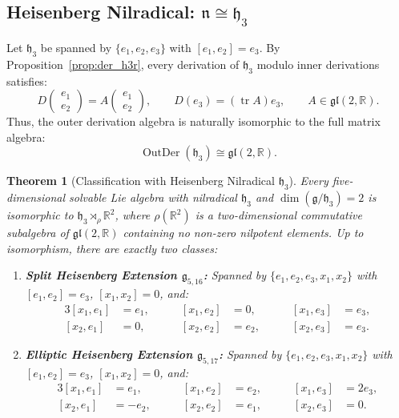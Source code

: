 \documentclass[11pt,a4paper]{article}
\newtheorem{theorem}{Theorem}[section]
\theoremstyle{definition}
\theoremstyle{remark}
\newcommand{\R}{\mathbb{R}}
\newcommand{\g}{\mathfrak{g}}
\newcommand{\n}{\mathfrak{n}}
\newcommand{\hh}{\mathfrak{h}}
\newcommand{\OutDer}{\operatorname{OutDer}}
\newcommand{\tr}{\operatorname{tr}}
\begin{document}
\subsection{Heisenberg Nilradical: $\n \cong \hh_3$}\label{subsec:H3_dim3}
Let $\hh_3$ be spanned by $\{e_1, e_2, e_3\}$ with $[e_1, e_2] = e_3$. By Proposition~\ref{prop:der_h3r}, every derivation of $\hh_3$ modulo inner derivations satisfies:
\begin{equation}
    D \begin{pmatrix} e_1 \\ e_2 \end{pmatrix} = A \begin{pmatrix} e_1 \\ e_2 \end{pmatrix}, \qquad D(e_3) = (\tr A) e_3, \qquad A \in \mathfrak{gl}(2, \R).
\end{equation}
Thus, the outer derivation algebra is naturally isomorphic to the full matrix algebra:
\begin{equation}
    \OutDer(\hh_3) \cong \mathfrak{gl}(2, \R).
\end{equation}

\begin{theorem}[Classification with Heisenberg Nilradical $\hh_3$]\label{thm:h3_codim2}
Every five-dimensional solvable Lie algebra with nilradical $\hh_3$ and $\dim(\g/\hh_3) = 2$ is isomorphic to $\hh_3 \rtimes_\rho \R^2$, where $\rho(\R^2)$ is a two-dimensional commutative subalgebra of $\mathfrak{gl}(2, \R)$ containing no non-zero nilpotent elements. Up to isomorphism, there are exactly two classes:
\begin{enumerate}
    \item \textbf{Split Heisenberg Extension $\g_{5,16}$:}
    Spanned by $\{e_1, e_2, e_3, x_1, x_2\}$ with $[e_1, e_2] = e_3$, $[x_1, x_2] = 0$, and:
    \begin{alignat}{3}
        [x_1, e_1] &= e_1, &\qquad [x_1, e_2] &= 0, &\qquad [x_1, e_3] &= e_3, \\
        [x_2, e_1] &= 0, &\qquad [x_2, e_2] &= e_2, &\qquad [x_2, e_3] &= e_3.
    \end{alignat}
    
    \item \textbf{Elliptic Heisenberg Extension $\g_{5,17}$:}
    Spanned by $\{e_1, e_2, e_3, x_1, x_2\}$ with $[e_1, e_2] = e_3$, $[x_1, x_2] = 0$, and:
    \begin{alignat}{3}
        [x_1, e_1] &= e_1, &\qquad [x_1, e_2] &= e_2, &\qquad [x_1, e_3] &= 2e_3, \\
        [x_2, e_1] &= -e_2, &\qquad [x_2, e_2] &= e_1, &\qquad [x_2, e_3] &= 0.
    \end{alignat}
\end{enumerate}
\end{theorem}
\end{document}
